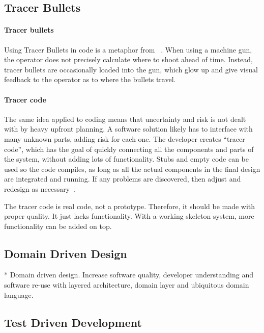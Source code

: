 \subsection{Tracer Bullets}

\paragraph{Tracer bullets}
Using Tracer Bullets in code is a metaphor from ~\cite{huntPragmaticProgrammerJourneyman2000}.
When using a machine gun, the operator does not precisely calculate where to shoot ahead of time.
Instead, tracer bullets are occasionally loaded into the gun, which glow up and give visual feedback to the operator as to where the bullets travel.


\paragraph{Tracer code}
The same idea applied to coding means that uncertainty and risk is not dealt with by heavy upfront planning.
A software solution likely has to interface with many unknown parts, adding risk for each one.
The developer creates ``tracer code'', which has the goal of quickly connecting all the components and parts of the system, without adding lots of functionality.
Stubs and empty code can be used so the code compiles, as long as all the actual components in the final design are integrated and running.
If any problems are discovered, then adjust and redesign as necessary~\cite{huntPragmaticProgrammerJourneyman2000}. 


The tracer code is real code, not a prototype.
Therefore, it should be made with proper quality.
It just lacks functionality.
With a working skeleton system, more functionality can be added on top.


\subsection{Domain Driven Design}


* Domain driven design. Increase software quality, developer understanding and software re-use with layered architecture, domain layer and ubiquitous domain language.

\subsection{Test Driven Development}

